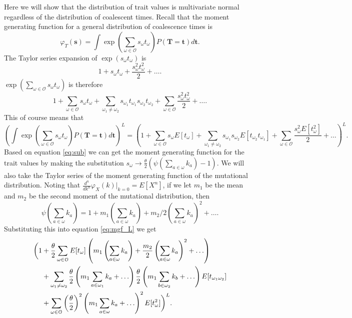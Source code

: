 Here we will show that the distribution of trait values is multivariate normal
regardless of the distribution of coalescent times. Recall that the moment
generating function for a general distribution of coalescence times is
\begin{equation}
  \varphi_T(\mathbf{s}) = \int \exp \left( \sum_{\omega \in \mathcal{O}} s_{\omega}t_{\omega} \right)
  P(\mathbf{T}=\mathbf{t})d\mathbf{t}.
\end{equation}
The Taylor series expansion of $\exp \left( s_{\omega}t_{\omega} \right)$ is
\begin{equation}
  1 + s_{\omega}t_{\omega} + \frac{s_{\omega}^2t_{\omega}^2}{2} + \ldots. \nonumber
\end{equation}
$\exp \left( \sum_{\omega \in \mathcal{O}} s_{\omega}t_{\omega} \right)$ is therefore
\begin{equation}
  1 + \sum_{\omega \in \mathcal{O}} s_{\omega}t_{\omega} +
  \sum_{\omega_1 \neq \omega_2} s_{\omega_1}t_{\omega_1}s_{\omega_2}t_{\omega_2} + 
  \sum_{\omega \in \mathcal{O}} \frac{s_{\omega}^2t_{\omega}^2}{2} + \ldots. \nonumber
\end{equation}
This of course means that
\begin{equation}
  \label{eq:mgf_L}
  \left(\int \exp \left( \sum_{\omega \in \mathcal{O}} s_{\omega}t_{\omega}
  \right)P(\mathbf{T}=\mathbf{t})d\mathbf{t}\right)^L = \left(1 + \sum_{\omega \in \mathcal{O}}
  s_{\omega}E[t_{\omega}] + \sum_{\omega_1 \neq \omega_2}
  s_{\omega_1}s_{\omega_2}E[t_{\omega_2}t_{\omega_1}] + \sum_{\omega \in
    \mathcal{O}} \frac{s_{\omega}^2E[t_{\omega}^2]}{2} + \ldots\right)^L. 
\end{equation}
Based on equation \ref{eq:sub} we can get the moment generating function for the
trait values by making the substitution $s_{\omega}\to \frac{\theta}{2} \left(
\psi\left(\sum_{a \in \omega}k_{a}\right) -1 \right)$. We will also take the
Taylor series of the moment generating function of the mutational distribution.
Noting that $\frac{d^n}{dk^n}\varphi_X(k)\Bigr|_{k=0} = E[X^n]$, if we let $m_1$
be the mean and $m_2$ be the second moment of the mutational distribution, then
\begin{equation}
  \psi\left( \sum_{a \in \omega} k_a \right) = 1 + m_1 \left( \sum_{a \in \omega}
  k_a\right) + m_2/2\left( \sum_{a \in \omega} k_a\right)^2 + \ldots.
  \nonumber
\end{equation}
Substituting this into equation \ref{eq:mgf_L} we get
\begin{align}
  \biggl( 1 &+ \frac{\theta}{2} \sum_{\omega \in \mathcal{O}} E[t_{\omega}]\left( m_1 \left(
  \sum_{a \in \omega} k_a \right) + \frac{m_2}{2} \left( \sum_{a \in \omega}
  k_a\right)^2 + \ldots \right) \\
  &+ \sum_{\omega_1 \neq \omega_2} \frac{\theta}{2}\left( m_1 \sum_{a \in \omega_1} k_a + \ldots \right)
  \frac{\theta}{2} \left( m_1 \sum_{b \in \omega_2} k_b + \ldots \right)
  E[t_{\omega_1\omega_2}] \\
  &+ \sum_{\omega \in \mathcal{O}} \left(\frac{\theta}{2}\right)^2\left(m_1 \sum_{a \in \omega} k_a +
  \ldots \right)^2 E[t^2_{\omega}] \biggr)^L.
\end{align}
